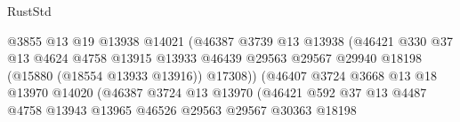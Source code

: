 \begin{lexlean}{RustStd}
\begin{coremodule}
                                            @3855
                                            @13
                                            @19
                                            @13938
                                            @14021
                                            (@46387
                                              @3739
                                              @13
                                              @13938
                                              (@46421
                                                @330
                                                @37
                                                @13
                                                @4624
                                                @4758
                                                @13915
                                                @13933
                                                @46439
                                                @29563
                                                @29567
                                                @29940
                                                @18198
                                                (@15880 (@18554 @13933 @13916))
                                                @17308))
                                            (@46407
                                              @3724
                                              @3668
                                              @13
                                              @18
                                              @13970
                                              @14020
                                              (@46387
                                                @3724
                                                @13
                                                @13970
                                                (@46421
                                                  @592
                                                  @37
                                                  @13
                                                  @4487
                                                  @4758
                                                  @13943
                                                  @13965
                                                  @46526
                                                  @29563
                                                  @29567
                                                  @30363
                                                  @18198

\end{coremodule}
\end{lexlean}
